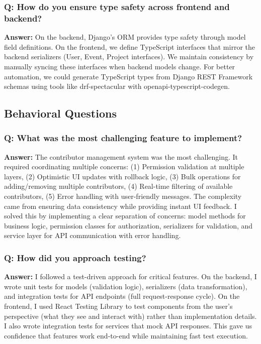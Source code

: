 \documentclass[11pt,a4paper]{article}
\begin{document}
\subsubsection{Q: How do you ensure type safety across frontend and backend?}
\textbf{Answer:} On the backend, Django's ORM provides type safety through model field definitions. On the frontend, we define TypeScript interfaces that mirror the backend serializers (User, Event, Project interfaces). We maintain consistency by manually syncing these interfaces when backend models change. For better automation, we could generate TypeScript types from Django REST Framework schemas using tools like drf-spectacular with openapi-typescript-codegen.

\subsection{Behavioral Questions}

\subsubsection{Q: What was the most challenging feature to implement?}
\textbf{Answer:} The contributor management system was the most challenging. It required coordinating multiple concerns: (1) Permission validation at multiple layers, (2) Optimistic UI updates with rollback logic, (3) Bulk operations for adding/removing multiple contributors, (4) Real-time filtering of available contributors, (5) Error handling with user-friendly messages. The complexity came from ensuring data consistency while providing instant UI feedback. I solved this by implementing a clear separation of concerns: model methods for business logic, permission classes for authorization, serializers for validation, and service layer for API communication with error handling.

\subsubsection{Q: How did you approach testing?}
\textbf{Answer:} I followed a test-driven approach for critical features. On the backend, I wrote unit tests for models (validation logic), serializers (data transformation), and integration tests for API endpoints (full request-response cycle). On the frontend, I used React Testing Library to test components from the user's perspective (what they see and interact with) rather than implementation details. I also wrote integration tests for services that mock API responses. This gave us confidence that features work end-to-end while maintaining fast test execution.
\end{document}
